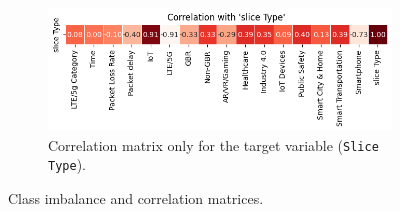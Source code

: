 \documentclass[conference]{IEEEtran}
\begin{document}
\begin{figure}[!t]
    \begin{subfigure}[b]{0.9\columnwidth}
        \centering
        \includegraphics[width=\columnwidth]{eda-plot-slice-type-only-red.png}
        \caption{Correlation matrix only for the target variable (\texttt{\footnotesize Slice Type}).}
        \label{fig:eda-plot-slice-type-only}
    \end{subfigure}
    \caption{Class imbalance and correlation matrices.}
    \label{fig:correlation_class_imbalance}
\end{figure}


\end{document}
